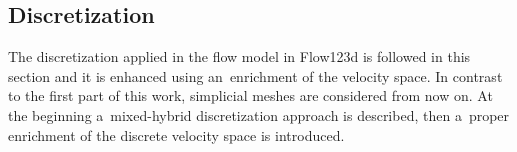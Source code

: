 
% 


\subsection{Discretization}

The discretization applied in the flow model in Flow123d is followed in this section
and it is enhanced using an~enrichment of the velocity space.
In contrast to the first part of this work, simplicial meshes are considered from now on.
At the beginning a~mixed-hybrid discretization approach is described,
then a~proper enrichment of the discrete velocity space is introduced.


